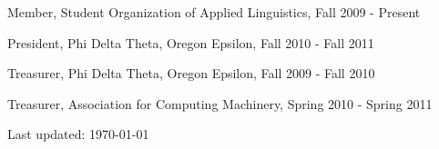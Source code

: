\documentclass[10pt,letterpaper]{article}
\renewenvironment{itemize}{
  \begin{list}{}{
    \setlength{\leftmargin}{1.5em}
    \setlength{\itemsep}{0em}
    \setlength{\parskip}{0pt}
    \setlength{\parsep}{0em}
  }
}{
  \end{list}
}
\begin{document}
\begin{itemize}

\item Member, Student Organization of Applied Linguistics, Fall 2009 - Present
\item President, Phi Delta Theta, Oregon Epsilon, Fall 2010 - Fall 2011
\item Treasurer, Phi Delta Theta, Oregon Epsilon, Fall 2009 - Fall 2010
\item Treasurer, Association for Computing Machinery, Spring 2010 - Spring 2011

\end{itemize}

\bigskip

\begin{center}
  \begin{small}
    Last updated: \today
  \end{small}
\end{center}
\end{document}
